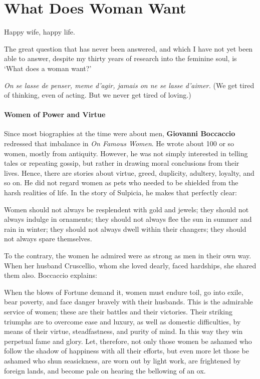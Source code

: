 \section{What Does Woman Want}

\begin{quotex}
Happy wife, happy life.

The great question that has never been answered, and which I have not yet been able to answer, despite my thirty years of research into the feminine soul, is `What does a woman want?'

\textit{On se lasse de penser, meme d'agir, jamais on ne se lasse d'aimer.} (We get tired of thinking, even of acting. But we never get tired of loving.)
\end{quotex}


\paragraph{Women of Power and Virtue}


Since most biographies at the time were about men, \textbf{Giovanni Boccaccio} redressed that imbalance in \emph{On Famous Women}. He wrote about 100 or so women, mostly from antiquity. However, he was not simply interested in telling tales or repeating gossip, but rather in drawing moral conclusions from their lives. Hence, there are stories about virtue, greed, duplicity, adultery, loyalty, and so on. He did not regard women as pets who needed to be shielded from the harsh realities of life. In the story of Sulpicia, he makes that perfectly clear:

\begin{quotex}
Women should not always be resplendent with gold and jewels; they should not always indulge in ornaments; they should not always flee the sun in summer and rain in winter; they should not always dwell within their changers; they should not always spare themselves.
\end{quotex}


To the contrary, the women he admired were as strong as men in their own way. When her husband Cruscellio, whom she loved dearly, faced hardships, she shared them also. Boccaccio explains:

\begin{quotex}
When the blows of Fortune demand it, women must endure toil, go into exile, bear poverty, and face danger bravely with their husbands. This is the admirable service of women; these are their battles and their victories. Their striking triumphs are to overcome ease and luxury, as well as domestic difficulties, by means of their virtue, steadfastness, and purity of mind. In this way they win perpetual fame and glory. Let, therefore, not only those women be ashamed who follow the shadow of happiness with all their efforts, but even more let those be ashamed who shun seasickness, are worn out by light work, are frightened by foreign lands, and become pale on hearing the bellowing of an ox.
\end{quotex}


